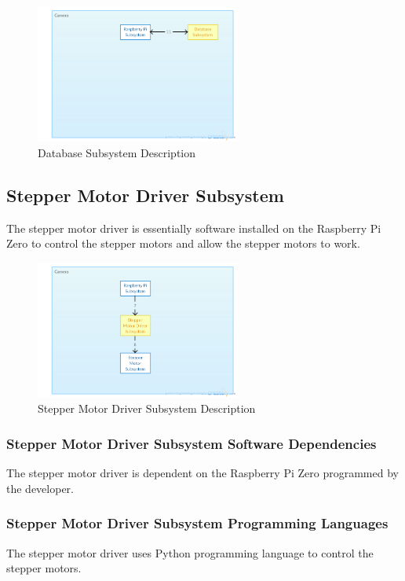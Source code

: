 \begin{figure}[h!] 
 	\centering 
  	\includegraphics[width=0.60\textwidth]{architectural design specification latex/images/ADSdiagrams/databasesubsystem.png} 
 \caption{Database Subsystem Description} 
\end{figure}


\subsection{Stepper Motor Driver Subsystem}
The stepper motor driver is essentially software installed on the Raspberry Pi Zero to control the stepper motors and allow the stepper motors to work.

\begin{figure}[h!] 
 	\centering 
  	\includegraphics[width=0.60\textwidth]{architectural design specification latex/images/ADSdiagrams/steppermotordriversubsystem.png} 
 \caption{Stepper Motor Driver Subsystem Description} 
\end{figure}


\subsubsection{Stepper Motor Driver Subsystem Software Dependencies}
The stepper motor driver is dependent on the Raspberry Pi Zero programmed by the developer.

\subsubsection{Stepper Motor Driver Subsystem Programming Languages}
The stepper motor driver uses Python programming language to control the stepper motors.



